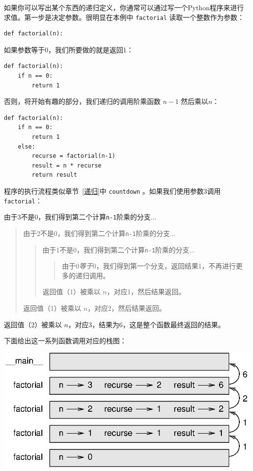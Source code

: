 
如果你可以写出某个东西的递归定义，你通常可以通过写一个Python程序来进行求值。第一步是决定参数。很明显在本例中 {\tt factorial} 读取一个整数作为参数：

\beforeverb
\begin{verbatim}
def factorial(n):
\end{verbatim}
\afterverb
%
如果参数等于0，我们所要做的就是返回1：

\beforeverb
\begin{verbatim}
def factorial(n):
    if n == 0:
        return 1
\end{verbatim}
\afterverb
%
否则，将开始有趣的部分，我们递归的调用阶乘函数 $n-1$ 然后乘以$n$：

\beforeverb
\begin{verbatim}
def factorial(n):
    if n == 0:
        return 1
    else:
        recurse = factorial(n-1)
        result = n * recurse
        return result
\end{verbatim}
\afterverb
%
程序的执行流程类似章节~\ref{递归}中 {\tt countdown} 。如果我们使用参数3调用 {\tt factorial}：

由于3不是0，我们得到第二个计算{\tt n-1}阶乘的分支...

\begin{quote}
由于2不是0，我们得到第二个计算{\tt n-1}阶乘的分支...


  \begin{quote}
  由于1不是0，我们得到第二个计算{\tt n-1}阶乘的分支...


    \begin{quote}
    由于0{\em 等于}0，我们得到第一个分支，返回结果1，不再进行更多的递归调用。
    \end{quote}


  返回值（1）被乘以 $n$，对应1，然后结果返回。
  \end{quote}


返回值（1）被乘以 $n$，对应2，然后结果返回。 
\end{quote}


返回值（2）被乘以 $n$，对应3，结果为6，这是整个函数最终返回的结果。

下面给出这一系列函数调用对应的栈图：

\vspace{0.1in}
\beforefig
\centerline{\includegraphics{figs/stack3.eps}}
\afterfig
\vspace{0.1in}

